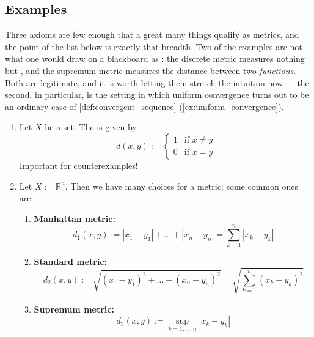 \subsection{Examples}

Three axioms are few enough that a great many things qualify as metrics, and the point of the
list below is exactly that breadth. Two of the examples are not what one would draw on a
blackboard as : the discrete metric measures nothing but ,
and the supremum metric measures the distance between two \emph{functions}. Both are legitimate,
and it is worth letting them stretch the intuition now --- the second, in particular, is the
setting in which uniform convergence turns out to be an ordinary case of
\cref{def:convergent_sequence} (\cref{ex:uniform_convergence}).

\begin{example}
\label{ex:metric_examples}
\begin{enumerate}[label=\textbf{(\alph*)}]
  \item Let $X$ be a set. The  is given by
    \[d(x,y) := \begin{cases} 1 & \text{if } x \neq y \\ 0 & \text{if } x = y \end{cases}\]
    Important for counterexamples!
  \item Let $X := \mathbb{R}^n$. Then we have many choices for a metric; some common ones are:
  \begin{enumerate}[label=\textbf{(\roman*)}]
    \item \textbf{Manhattan metric:}
      \[d_1(x,y) := |x_1 - y_1| + \dots + |x_n - y_n| = \sum_{k=1}^{n} |x_k - y_k|\]
    \item \textbf{Standard metric:}
      \[d_2(x,y) := \sqrt{(x_1-y_1)^2 + \dots + (x_n-y_n)^2} = \sqrt{\sum_{k=1}^{n}(x_k - y_k)^2}\]
    \item \textbf{Supremum metric:}
      \[d_3(x,y) := \sup_{k = 1,\dots,n} |x_k - y_k|\]
  \end{enumerate}
\end{enumerate}
\end{example}

